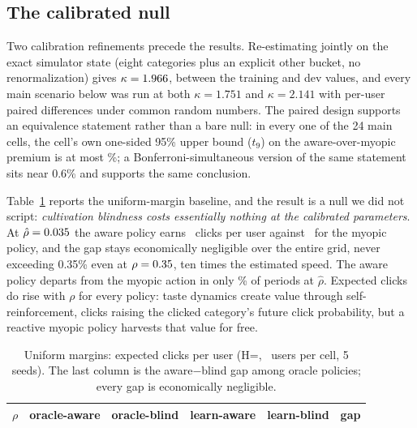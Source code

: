 \documentclass[11pt]{article}
\begin{document}
\subsection{The calibrated null}

Two calibration refinements precede the results. Re-estimating jointly on
the exact simulator state (eight categories plus an explicit other bucket,
no renormalization) gives $\kappa=1.966$, between the training and dev
values, and every main scenario below was run at both $\kappa=1.751$ and
$\kappa=2.141$ with per-user paired differences under common random
numbers. The paired design supports an equivalence statement rather than a
bare null: in every one of the 24 main cells, the cell's own one-sided
95\% upper bound ($t_9$) on the aware-over-myopic premium is at most
\equivbound\%; a Bonferroni-simultaneous version of the same statement
sits near 0.6\% and supports the same conclusion.

Table~\ref{tab:sim} reports the uniform-margin baseline, and the result is a
null we did not script: \emph{cultivation blindness costs essentially
nothing at the calibrated parameters}. At $\hat\rho=0.035$ the aware
policy earns \clkoa\ clicks per user against \clkob\ for the myopic policy,
and the gap stays economically negligible over the entire grid, never
exceeding 0.35\% even at $\rho=0.35$, ten times the estimated speed. The
aware policy departs from the myopic action in only \bridgeshare\% of
periods at $\hat\rho$. Expected clicks do rise with $\rho$ for every
policy: taste dynamics create value through self-reinforcement, clicks
raising the clicked category's future click probability, but a reactive
myopic policy harvests that value for free.

\begin{table}[ht]
\centering
\caption{Uniform margins: expected clicks per user (H=\simH, \simEp\ users
per cell, 5 seeds). The last column is the aware$-$blind gap among oracle
policies; every gap is economically negligible.}
\label{tab:sim}
\begin{tabular}{rrrrrr}
\toprule
$\rho$ & oracle-aware & oracle-blind & learn-aware & learn-blind & gap \\
\midrule

\end{tabular}
\end{table}
\end{document}
